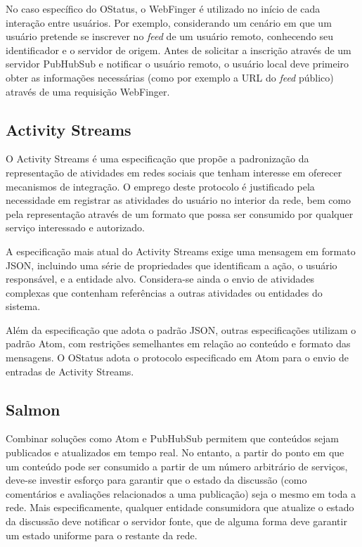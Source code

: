 No caso específico do OStatus, o WebFinger é utilizado no início de cada interação
entre usuários. Por exemplo, considerando um cenário em que um usuário pretende se 
inscrever no \textit{feed} de um usuário remoto, conhecendo seu identificador e o 
servidor de origem. Antes de solicitar a inscrição através de um servidor PubHubSub
e notificar o usuário remoto, o usuário local deve primeiro obter as informações
necessárias (como por exemplo a URL do \textit{feed} público) através de uma
requisição  WebFinger.

\subsection{Activity Streams}

O Activity Streams é uma especificação que propõe a padronização da representação
de atividades em redes sociais que tenham interesse em oferecer mecanismos de
integração. O emprego deste protocolo é justificado pela necessidade em registrar
as atividades do usuário no interior da rede, bem como pela representação através
de um formato que possa ser consumido por qualquer serviço interessado e autorizado.

A especificação mais atual do Activity Streams exige uma mensagem em formato JSON, 
incluindo uma série de propriedades que identificam a ação, o usuário responsável, 
e a entidade alvo. Considera-se ainda o envio de atividades complexas que contenham
referências a outras atividades ou entidades do sistema. 

Além da especificação que adota o padrão JSON, outras especificações utilizam o 
padrão Atom, com restrições semelhantes em relação ao conteúdo e formato das 
mensagens. O OStatus adota o protocolo especificado em Atom para o envio de entradas
de Activity Streams.

\subsection{Salmon}

Combinar soluções como Atom e PubHubSub permitem que conteúdos sejam publicados e
atualizados em tempo real. No entanto, a partir do ponto em que um conteúdo pode
ser consumido a partir de um número arbitrário de serviços, deve-se investir
esforço para garantir que o estado da discussão (como comentários e avaliações
relacionados a uma publicação) seja o mesmo em toda a rede. Mais especificamente,
qualquer entidade consumidora que atualize o estado da discussão deve notificar o
servidor fonte, que de alguma forma deve garantir um estado uniforme para o restante
da rede.

